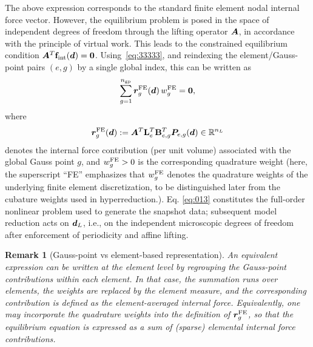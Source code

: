 \documentclass[11pt,a4paper]{article}
\newtheorem{remark}{Remark}
\begin{document}
The above expression corresponds to the standard finite element nodal internal
force vector. However, the equilibrium problem is posed in the space of
independent degrees of freedom through the lifting operator $\bm{A}$, in
accordance with the principle of virtual work. This leads to the constrained
equilibrium condition $\bm{A}^T \mathbf{f}_{\mathrm{int}}(\bm{d}) = \bm{0}$. Using~\eqref{eq:33333},
and reindexing the element/Gauss-point pairs $(e,g)$ by a single global index,
this can be written as
\begin{equation}
\label{eq:013}
      \sum_{g=1}^{n_{\mathrm{gp}}}
    \bm{r}^{\mathrm{FE}}_{g}(\bm{d})\, w^{\mathrm{FE}}_{g}
    =
    \bm{0},
\end{equation}
where
\begin{equation}
    \bm{r}^{\mathrm{FE}}_{g}(\bm{d})
    :=
    \bm{A}^T \mathbf{L}_e^T \mathbf{B}_{e,g}^T \boldsymbol{P}_{e,g}(\bm{d})
    \in \mathbb{R}^{n_L}
\end{equation}
denotes the   internal force contribution (per unit volume) associated with the global
Gauss point $g$, and $w^{\mathrm{FE}}_{g} >0$ is the corresponding
quadrature weight (here, the superscript ``FE'' emphasizes that $w^{\mathrm{FE}}_{g}$ denotes the quadrature
weights of the underlying finite element discretization, to be distinguished
later from the cubature weights used in hyperreduction.).  Eq. \ref{eq:013} constitutes the full-order nonlinear problem used to generate the snapshot
data; subsequent model reduction acts on $\bm{d}_L$, i.e., on the independent
microscopic degrees of freedom after enforcement of periodicity and affine
lifting.
\begin{remark}[Gauss-point vs element-based representation]
An equivalent expression can be written at the element level by regrouping the
Gauss-point contributions within each element. In that case, the summation runs
over elements, the weights are replaced by the element measure, and the
corresponding contribution is defined as the element-averaged internal force.
Equivalently, one may incorporate the quadrature weights into the definition of
$\bm{r}^{\mathrm{FE}}_{g}$, so that the equilibrium equation is expressed as a sum  of (sparse) elemental internal force contributions.
\end{remark}




\end{document}
